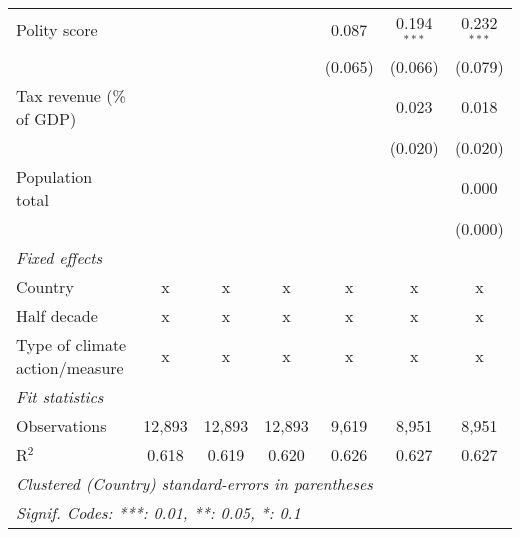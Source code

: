 \begin{tabular}{lcccccc}
   Polity score                                                          &         &                &                & 0.087          & 0.194$^{***}$  & 0.232$^{***}$\\   
                                                                         &         &                &                & (0.065)        & (0.066)        & (0.079)\\   
   Tax revenue (\% of GDP)                                               &         &                &                &                & 0.023          & 0.018\\   
                                                                         &         &                &                &                & (0.020)        & (0.020)\\   
   Population total                                                      &         &                &                &                &                & 0.000\\   
                                                                         &         &                &                &                &                & (0.000)\\   
   \emph{Fixed effects}\\
   Country                                                               & x       & x              & x              & x              & x              & x\\  
   Half decade                                                           & x       & x              & x              & x              & x              & x\\  
   Type of climate action/measure                                        & x       & x              & x              & x              & x              & x\\  
   \midrule \emph{Fit statistics}\\
   Observations                                                          & 12,893  & 12,893         & 12,893         & 9,619          & 8,951          & 8,951\\  
   R$^2$                                                                 & 0.618   & 0.619          & 0.620          & 0.626          & 0.627          & 0.627\\  
   \midrule
   \multicolumn{7}{l}{\emph{Clustered (Country) standard-errors in parentheses}}\\
   \multicolumn{7}{l}{\emph{Signif. Codes: ***: 0.01, **: 0.05, *: 0.1}}\\
\end{tabular}
\par\endgroup


